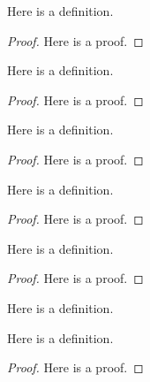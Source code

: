 \begin{lemma}\label{b_winner_max}
    \leanok
    Here is a definition.
\end{lemma}
\begin{proof}
    Here is a proof.
\end{proof}

\begin{lemma}\label{b_winner}
    \leanok
    Here is a definition.
\end{lemma}
\begin{proof}
    Here is a proof.
\end{proof}

\begin{lemma}\label{b_loser_max}
    \leanok
    Here is a definition.
\end{lemma}
\begin{proof}
    Here is a proof.
\end{proof}

\begin{lemma}\label{utility_nneg}
    \leanok
    Here is a definition.
\end{lemma}
\begin{proof}
    Here is a proof.
\end{proof}

\begin{lemma}\label{valuation_is_dominant}
    \leanok
    Here is a definition.
\end{lemma}
\begin{proof}
    Here is a proof.
\end{proof}

\begin{definition}\label{Utility.FirstPrice}
    \leanok
    Here is a definition.
\end{definition}

\begin{lemma}\label{utility_first_price_winner}
    \leanok
    Here is a definition.
\end{lemma}
\begin{proof}
    Here is a proof.
\end{proof}

